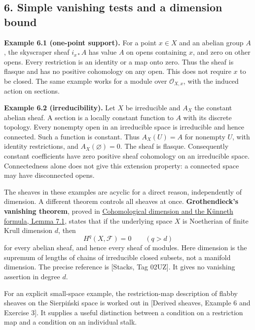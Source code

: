 \documentclass[11pt]{article}
\begin{document}
\subsection{6. Simple vanishing tests and a dimension
bound}\label{simple-vanishing-tests-and-a-dimension-bound}

\textbf{Example 6.1 (one-point support).} For a point \(x\in X\) and an
abelian group \(A\), the skyscraper sheaf \(i_{x*}A\) has value \(A\) on
opens containing \(x\), and zero on other opens. Every restriction is an
identity or a map onto zero. Thus the sheaf is flasque and has no
positive cohomology on any open. This does not require \(x\) to be
closed. The same example works for a module over \(\mathcal O_{X,x}\),
with the induced action on sections.

\textbf{Example 6.2 (irreducibility).} Let \(X\) be irreducible and
\(A_X\) the constant abelian sheaf. A section is a locally constant
function to \(A\) with its discrete topology. Every nonempty open in an
irreducible space is irreducible and hence connected. Such a function is
constant. Thus \(A_X(U)=A\) for nonempty \(U\), with identity
restrictions, and \(A_X(\varnothing)=0\). The sheaf is flasque.
Consequently constant coefficients have zero positive sheaf cohomology
on an irreducible space. Connectedness alone does not give this
extension property: a connected space may have disconnected opens.

The sheaves in these examples are acyclic for a direct reason,
independently of dimension. A different theorem controls all sheaves at
once. \textbf{Grothendieck's vanishing theorem}, proved in
\href{../ag-etale-cohomology/cohomological-dimension-and-the-kunneth-formula.html\#7-the-bound-for-all-finite-type-schemes}{Cohomological
dimension and the Künneth formula, Lemma 7.1}, states that if the
underlying space \(X\) is Noetherian of finite Krull dimension \(d\),
then \[
H^q(X,\mathcal F)=0\qquad(q>d)
\] for every abelian sheaf, and hence every sheaf of modules. Here
dimension is the supremum of lengths of chains of irreducible closed
subsets, not a manifold dimension. The precise reference is {[}Stacks,
Tag 02UZ{]}. It gives no vanishing assertion in degree \(d\).

For an explicit small-space example, the restriction-map description of
flabby sheaves on the Sierpiński space is worked out in {[}Derived
sheaves, Example 6 and Exercise 3{]}. It supplies a useful distinction
between a condition on a restriction map and a condition on an
individual stalk.
\end{document}
